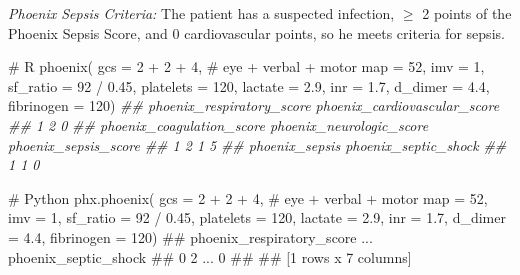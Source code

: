 \documentclass[
  letterpaper,
  DIV=11,
  numbers=noendperiod]{scrartcl}
\newenvironment{Shaded}{\begin{snugshade}}{\end{snugshade}}
\newcommand{\AttributeTok}[1]{\textcolor[rgb]{0.40,0.45,0.13}{#1}}
\newcommand{\BuiltInTok}[1]{\textcolor[rgb]{0.00,0.23,0.31}{#1}}
\newcommand{\CommentTok}[1]{\textcolor[rgb]{0.37,0.37,0.37}{#1}}
\newcommand{\DecValTok}[1]{\textcolor[rgb]{0.68,0.00,0.00}{#1}}
\newcommand{\DocumentationTok}[1]{\textcolor[rgb]{0.37,0.37,0.37}{\textit{#1}}}
\newcommand{\FloatTok}[1]{\textcolor[rgb]{0.68,0.00,0.00}{#1}}
\newcommand{\FunctionTok}[1]{\textcolor[rgb]{0.28,0.35,0.67}{#1}}
\newcommand{\NormalTok}[1]{\textcolor[rgb]{0.00,0.23,0.31}{#1}}
\newcommand{\OperatorTok}[1]{\textcolor[rgb]{0.37,0.37,0.37}{#1}}
\newcommand{\SpecialCharTok}[1]{\textcolor[rgb]{0.37,0.37,0.37}{#1}}
\begin{document}
\emph{Phoenix Sepsis Criteria:} The patient has a suspected infection,
\(\geq\) 2 points of the Phoenix Sepsis Score, and 0 cardiovascular
points, so he meets criteria for sepsis.

\begin{Shaded}
\begin{Highlighting}[]
\CommentTok{\# R}
\FunctionTok{phoenix}\NormalTok{(}
  \AttributeTok{gcs =} \DecValTok{2} \SpecialCharTok{+} \DecValTok{2} \SpecialCharTok{+} \DecValTok{4}\NormalTok{, }\CommentTok{\# eye + verbal + motor}
  \AttributeTok{map =} \DecValTok{52}\NormalTok{,}
  \AttributeTok{imv =} \DecValTok{1}\NormalTok{,}
  \AttributeTok{sf\_ratio =} \DecValTok{92} \SpecialCharTok{/} \FloatTok{0.45}\NormalTok{,}
  \AttributeTok{platelets =} \DecValTok{120}\NormalTok{,}
  \AttributeTok{lactate =} \FloatTok{2.9}\NormalTok{,}
  \AttributeTok{inr =} \FloatTok{1.7}\NormalTok{,}
  \AttributeTok{d\_dimer =} \FloatTok{4.4}\NormalTok{,}
  \AttributeTok{fibrinogen =} \DecValTok{120}\NormalTok{)}
\DocumentationTok{\#\#   phoenix\_respiratory\_score phoenix\_cardiovascular\_score}
\DocumentationTok{\#\# 1                         2                            0}
\DocumentationTok{\#\#   phoenix\_coagulation\_score phoenix\_neurologic\_score phoenix\_sepsis\_score}
\DocumentationTok{\#\# 1                         2                        1                    5}
\DocumentationTok{\#\#   phoenix\_sepsis phoenix\_septic\_shock}
\DocumentationTok{\#\# 1              1                    0}
\end{Highlighting}
\end{Shaded}

\begin{Shaded}
\begin{Highlighting}[]
\CommentTok{\# Python}
\NormalTok{phx.phoenix(}
\NormalTok{  gcs }\OperatorTok{=} \DecValTok{2} \OperatorTok{+} \DecValTok{2} \OperatorTok{+} \DecValTok{4}\NormalTok{, }\CommentTok{\# eye + verbal + motor}
  \BuiltInTok{map} \OperatorTok{=} \DecValTok{52}\NormalTok{,}
\NormalTok{  imv }\OperatorTok{=} \DecValTok{1}\NormalTok{,}
\NormalTok{  sf\_ratio }\OperatorTok{=} \DecValTok{92} \OperatorTok{/} \FloatTok{0.45}\NormalTok{,}
\NormalTok{  platelets }\OperatorTok{=} \DecValTok{120}\NormalTok{,}
\NormalTok{  lactate }\OperatorTok{=} \FloatTok{2.9}\NormalTok{,}
\NormalTok{  inr }\OperatorTok{=} \FloatTok{1.7}\NormalTok{,}
\NormalTok{  d\_dimer }\OperatorTok{=} \FloatTok{4.4}\NormalTok{,}
\NormalTok{  fibrinogen }\OperatorTok{=} \DecValTok{120}\NormalTok{)}
\CommentTok{\#\#    phoenix\_respiratory\_score  ...  phoenix\_septic\_shock}
\CommentTok{\#\# 0                          2  ...                     0}
\CommentTok{\#\# }
\CommentTok{\#\# [1 rows x 7 columns]}
\end{Highlighting}
\end{Shaded}
\end{document}

